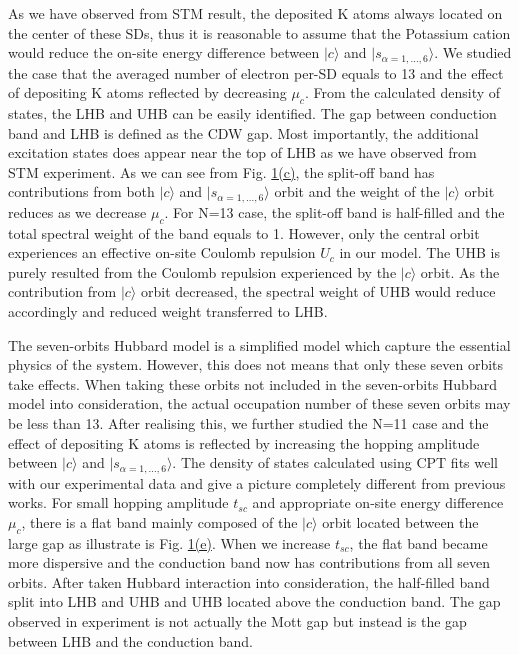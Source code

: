 \documentclass[aps,prl,twocolumn,superscriptaddress]{revtex4}
\begin{document}
As we have observed from STM result, the deposited K atoms always located on the center of these SDs, thus it is reasonable to assume that the Potassium cation would reduce the on-site energy difference between $\vert c \rangle$ and $\vert s_{\alpha=1,\dots,6} \rangle$. We studied the case that the averaged number of electron per-SD equals to 13 and the effect of depositing K atoms reflected by decreasing $\mu_c$. From the calculated density of states, the LHB and UHB can be easily identified. The gap between conduction band and LHB is defined as the CDW gap. Most importantly, the additional excitation states does appear near the top of LHB as we have observed from STM experiment. As we can see from Fig. \hyperref[fig:TheoreticalFormalism]{1(c)}, the split-off band has contributions from both $\vert c \rangle$ and $\vert s_{\alpha=1,\dots,6} \rangle$ orbit and the weight of the $\vert c \rangle$ orbit reduces as we decrease $\mu_c$. For N=13 case, the split-off band is half-filled and the total spectral weight of the band equals to 1. However, only the central orbit experiences an effective on-site Coulomb repulsion $U_c$ in our model. The UHB is purely resulted from the Coulomb repulsion experienced by the $\vert c \rangle$ orbit. As the contribution from $\vert c \rangle$ orbit decreased, the spectral weight of UHB would reduce accordingly and reduced weight transferred to LHB.

The seven-orbits Hubbard model is a simplified model which capture the essential physics of the system. However, this does not means that only these seven orbits take effects. When taking these orbits not included in the seven-orbits Hubbard model into consideration, the actual occupation number of these seven orbits may be less than 13. After realising this, we further studied the N=11 case and the effect of depositing K atoms is reflected by increasing the hopping amplitude between $\vert c \rangle$ and $\vert s_{\alpha=1,\dots,6} \rangle$. The density of states calculated using CPT fits well with our experimental data and give a picture completely different from previous works. For small hopping amplitude $t_{sc}$ and appropriate on-site energy difference $\mu_c$, there is a flat band mainly composed of the $\vert c \rangle$ orbit located between the large gap as illustrate is Fig. \hyperref[fig:TheoreticalFormalism]{1(e)}. When we increase $t_{sc}$, the flat band became more dispersive and the conduction band now has contributions from all seven orbits. After taken Hubbard interaction into consideration, the half-filled band split into LHB and UHB and UHB located above the conduction band. The gap observed in experiment is not actually the Mott gap but instead is the gap between LHB and the conduction band.
\end{document}
